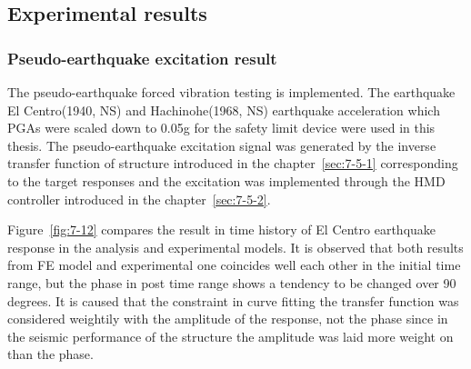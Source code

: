 \subsection{Experimental results}
\subsubsection{Pseudo-earthquake excitation result}
The pseudo-earthquake forced vibration testing is implemented. The earthquake El Centro(1940, NS) and Hachinohe(1968, NS) earthquake acceleration which PGAs were scaled down to 0.05g for the safety limit device were used in this thesis. The pseudo-earthquake excitation signal was generated by the inverse transfer function of structure introduced in the chapter~\ref{sec:7-5-1} corresponding to the target responses and the excitation was implemented through the HMD controller introduced in the chapter~\ref{sec:7-5-2}.

Figure~\ref{fig:7-12} compares the result in time history of El Centro earthquake response in the analysis and experimental models. It is observed that both results from FE model and experimental one coincides well each other in the initial time range, but the phase in post time range shows a tendency to be changed over 90 degrees. It is caused that the constraint in curve fitting the transfer function was considered weightily with the amplitude of the response, not the phase since in the seismic performance of the structure the amplitude was laid more weight on than the phase.


